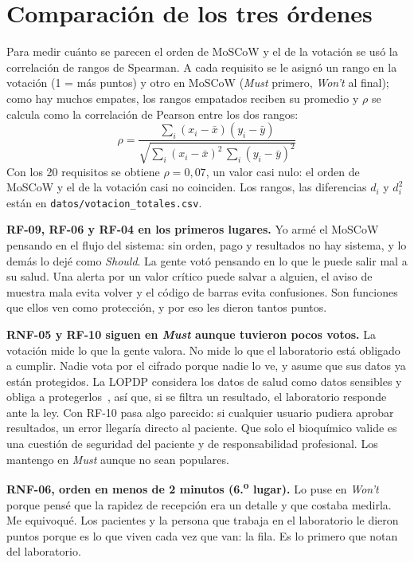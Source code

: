 \documentclass[11pt,a4paper]{article}
\begin{document}
\section{Comparación de los tres órdenes}
Para medir cuánto se parecen el orden de MoSCoW y el de la votación se usó la correlación de rangos de Spearman. A cada requisito se le asignó un rango en la votación (1 = más puntos) y otro en MoSCoW (\emph{Must} primero, \emph{Won't} al final); como hay muchos empates, los rangos empatados reciben su promedio y $\rho$ se calcula como la correlación de Pearson entre los dos rangos:
\[
\rho = \frac{\sum_i (x_i-\bar{x})(y_i-\bar{y})}{\sqrt{\sum_i (x_i-\bar{x})^2 \, \sum_i (y_i-\bar{y})^2}}
\]
Con los 20 requisitos se obtiene $\rho = 0{,}07$, un valor casi nulo: el orden de MoSCoW y el de la votación casi no coinciden. Los rangos, las diferencias $d_i$ y $d_i^2$ están en \texttt{datos/votacion\_totales.csv}.

\textbf{RF-09, RF-06 y RF-04 en los primeros lugares.} Yo armé el MoSCoW pensando en el flujo del sistema: sin orden, pago y resultados no hay sistema, y lo demás lo dejé como \emph{Should}. La gente votó pensando en lo que le puede salir mal a su salud. Una alerta por un valor crítico puede salvar a alguien, el aviso de muestra mala evita volver y el código de barras evita confusiones. Son funciones que ellos ven como protección, y por eso les dieron tantos puntos.

\textbf{RNF-05 y RF-10 siguen en \emph{Must} aunque tuvieron pocos votos.} La votación mide lo que la gente valora. No mide lo que el laboratorio está obligado a cumplir. Nadie vota por el cifrado porque nadie lo ve, y asume que sus datos ya están protegidos. La LOPDP considera los datos de salud como datos sensibles y obliga a protegerlos~\cite{lopdp2021}, así que, si se filtra un resultado, el laboratorio responde ante la ley. Con RF-10 pasa algo parecido: si cualquier usuario pudiera aprobar resultados, un error llegaría directo al paciente. Que solo el bioquímico valide es una cuestión de seguridad del paciente y de responsabilidad profesional. Los mantengo en \emph{Must} aunque no sean populares.

\textbf{RNF-06, orden en menos de 2 minutos (6.\textsuperscript{o} lugar).} Lo puse en \emph{Won't} porque pensé que la rapidez de recepción era un detalle y que costaba medirla. Me equivoqué. Los pacientes y la persona que trabaja en el laboratorio le dieron puntos porque es lo que viven cada vez que van: la fila. Es lo primero que notan del laboratorio.
\end{document}
